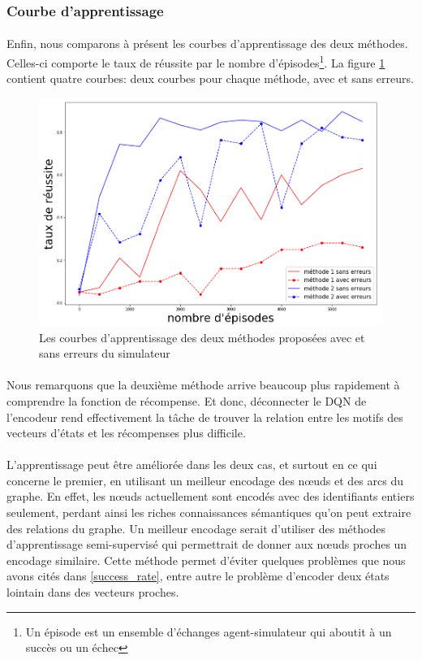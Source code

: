 \subsubsection{Courbe d'apprentissage}
\paragraph{}Enfin, nous comparons à présent les courbes d'apprentissage des deux méthodes. Celles-ci comporte le taux de réussite par le nombre d'épisodes\footnote{Un épisode est un ensemble d'échanges agent-simulateur qui aboutit à un succès ou un échec}. La figure \ref{courbes} contient quatre courbes: deux courbes pour chaque méthode, avec et sans erreurs.
\begin{figure}[H] 
	\centering
	\includegraphics[width=0.95\linewidth]{images/Realisation/DM/courbes.png}
	\caption{Les courbes d'apprentissage des deux méthodes proposées avec et sans erreurs du simulateur}\label{courbes}
\end{figure}
\paragraph{}Nous remarquons que la deuxième méthode arrive beaucoup plus rapidement à comprendre la fonction de récompense. Et donc, déconnecter le DQN de l'encodeur rend effectivement la tâche de trouver la relation entre les motifs des vecteurs d'états et les récompenses plus difficile.
\paragraph{} L'apprentissage peut être améliorée dans les deux cas, et surtout en ce qui concerne le premier, en utilisant un meilleur encodage des n\oe{}uds et des arcs du graphe. En effet, les n\oe{}uds actuellement sont encodés avec des identifiants entiers seulement, perdant ainsi les riches connaissances sémantiques qu'on peut extraire des relations du graphe. Un meilleur encodage serait d'utiliser des méthodes d'apprentissage semi-supervisé qui permettrait de donner aux n\oe{}uds proches un encodage similaire. Cette méthode permet d'éviter quelques problèmes que nous avons cités dans \ref{success_rate}, entre autre le problème d'encoder deux états lointain dans des vecteurs proches.

